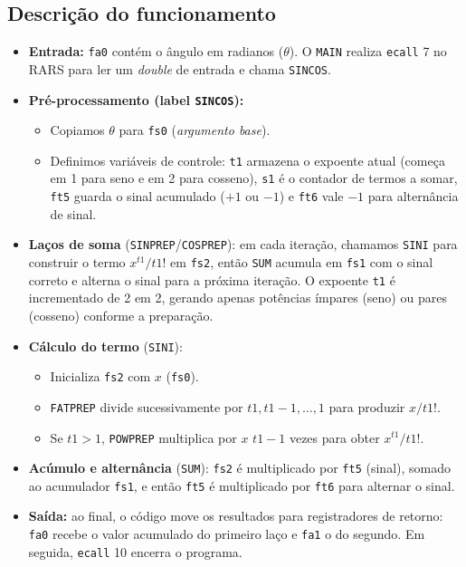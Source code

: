 \documentclass[12pt,a4paper]{article}
\begin{document}
\subsection*{Descrição do funcionamento}
\begin{itemize}
    \item \textbf{Entrada:} \texttt{fa0} contém o ângulo em radianos (\(\theta\)). O \texttt{MAIN} realiza \texttt{ecall} 7 no RARS para ler um \emph{double} de entrada e chama \texttt{SINCOS}.
    \item \textbf{Pré-processamento (label \texttt{SINCOS}):}
    \begin{itemize}
        \item Copiamos \(\theta\) para \texttt{fs0} (\textit{argumento base}).
        \item Definimos variáveis de controle: \texttt{t1} armazena o expoente atual (começa em 1 para seno e em 2 para cosseno), \texttt{s1} é o contador de termos a somar, \texttt{ft5} guarda o sinal acumulado (\(+1\) ou \(-1\)) e \texttt{ft6} vale \(-1\) para alternância de sinal.
    \end{itemize}
    \item \textbf{Laços de soma} (\texttt{SINPREP}/\texttt{COSPREP}): em cada iteração, chamamos \texttt{SINI} para construir o termo \(x^{t1}/t1!\) em \texttt{fs2}, então \texttt{SUM} acumula em \texttt{fs1} com o sinal correto e alterna o sinal para a próxima iteração. O expoente \texttt{t1} é incrementado de 2 em 2, gerando apenas potências ímpares (seno) ou pares (cosseno) conforme a preparação.
    \item \textbf{Cálculo do termo} (\texttt{SINI}):
    \begin{itemize}
        \item Inicializa \texttt{fs2} com \(x\) (\texttt{fs0}).
        \item \texttt{FATPREP} divide sucessivamente por \(t1, t1-1, \dots, 1\) para produzir \(x/t1!\).
        \item Se \(t1>1\), \texttt{POWPREP} multiplica por \(x\) \(t1-1\) vezes para obter \(x^{t1}/t1!\).
    \end{itemize}
    \item \textbf{Acúmulo e alternância} (\texttt{SUM}): \texttt{fs2} é multiplicado por \texttt{ft5} (sinal), somado ao acumulador \texttt{fs1}, e então \texttt{ft5} é multiplicado por \texttt{ft6} para alternar o sinal.
    \item \textbf{Saída:} ao final, o código move os resultados para registradores de retorno: \texttt{fa0} recebe o valor acumulado do primeiro laço e \texttt{fa1} o do segundo. Em seguida, \texttt{ecall} 10 encerra o programa.
\end{itemize}
\end{document}
